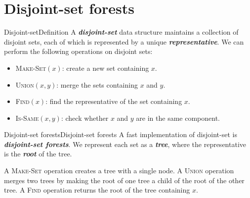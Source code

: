 \documentclass[aspectratio=169]{ctexbeamer}
\newcommand{\highlight}[1]{\textbf{\textit{#1}}}
\begin{document}
    \section{Disjoint-set forests}

    \begin{frame}{Disjoint-set}{Definition}
        A \highlight{disjoint-set} data structure maintains a collection of disjoint sets, each of which is represented by a unique \highlight{representative}. We can perform the following operations on disjoint sets:

        \begin{itemize}
            \item \textsc{Make-Set}$(x)$: create a new set containing $x$.
            \item \textsc{Union}$(x,y)$: merge the sets containing $x$ and $y$.
            \item \textsc{Find}$(x)$: find the representative of the set containing $x$.
            \item \textsc{Is-Same}$(x,y)$: check whether $x$ and $y$ are in the same component.
        \end{itemize}
    \end{frame}

    \begin{frame}{Disjoint-set forests}{Disjoint-set forests}
        A fast implementation of disjoint-set is \highlight{disjoint-set forests}. We represent each set as a \highlight{tree}, where the representative is the \highlight{root} of the tree.

        A \textsc{Make-Set} operation creates a tree with a single node. A \textsc{Union} operation merges two trees by making the root of one tree a child of the root of the other tree. A \textsc{Find} operation returns the root of the tree containing $x$.
    \end{frame}
\end{document}
